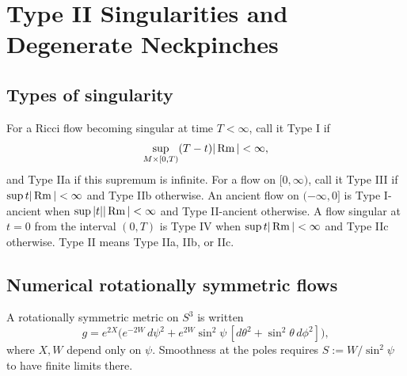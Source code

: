 \chapter[36]{Type II Singularities and Degenerate Neckpinches}
\label{ch:chow-iv-type-ii-degenerate-neckpinches}

\section{Types of singularity}

\begin{definition}
\label{def:chow-iv-singularity-types}

For a Ricci flow becoming singular at time $T<\infty$, call it Type I if
\[
 \sup_{M\times[0,T)}(T-t)|\operatorname{Rm}|<\infty,
\]
and Type IIa if this supremum is infinite.  For a flow on
$[0,\infty)$, call it Type III if $\sup t|\operatorname{Rm}|<\infty$ and Type IIb
otherwise.  An ancient flow on $(-\infty,0]$ is Type I-ancient when
$\sup |t||\operatorname{Rm}|<\infty$ and Type II-ancient otherwise.  A flow singular at
$t=0$ from the interval $(0,T)$ is Type IV when $\sup t|\operatorname{Rm}|<\infty$ and
Type IIc otherwise.  Type II means Type IIa, IIb, or IIc.
\end{definition}

\section{Numerical rotationally symmetric flows}

\begin{definition}
\label{def:chow-iv-rotational-s3-metric}

A rotationally symmetric metric on $S^3$ is written
\[
 g=e^{2X}\bigl(e^{-2W}\,d\psi^2+e^{2W}\sin^2\psi\,[d\theta^2+
 \sin^2\theta\,d\phi^2]\bigr),
\]
where $X,W$ depend only on $\psi$.  Smoothness at the poles requires
$S:=W/\sin^2\psi$ to have finite limits there.
\end{definition}

